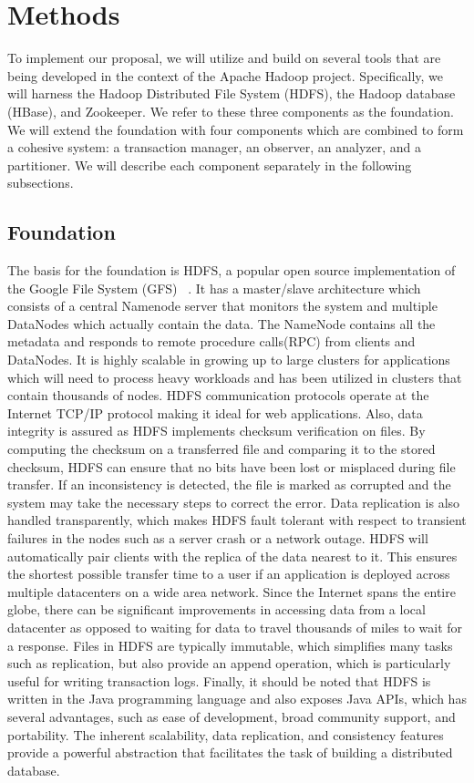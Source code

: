 \documentclass[10pt,final,journal]{IEEEtran}
\begin{document}


\section{Methods}
To implement our proposal, we will utilize and build on several tools that are being developed in the context of the Apache Hadoop project. Specifically, we will harness the Hadoop Distributed File System (HDFS), the Hadoop database (HBase), and Zookeeper. We refer to these three components as the foundation. We will extend the foundation with four components which are combined to form a cohesive system: a transaction manager, an observer, an analyzer, and a partitioner. We will describe each component separately in the following subsections.

\subsection{Foundation}
The basis for the foundation is HDFS, a popular open source implementation of the Google File System (GFS) ~\cite{Ghemawat:2003:GFS:1165389.945450}. It has a master/slave architecture which consists of a central Namenode server that monitors the system and multiple DataNodes which actually contain the data. The NameNode contains all the metadata and responds to remote procedure calls(RPC) from clients and DataNodes. It is highly scalable in growing up to large clusters for applications which will need to process heavy workloads and has been utilized in clusters that contain thousands of nodes.  HDFS communication protocols operate at the Internet TCP/IP protocol making it ideal for web applications. Also, data integrity is assured as HDFS implements checksum verification on files. By computing the checksum on a transferred file and comparing it to the stored checksum, HDFS can ensure that no bits have been lost or misplaced during file transfer. If an inconsistency is detected, the file is marked as corrupted and the system may take the necessary steps to correct the error.  Data replication is also handled transparently, which makes HDFS fault tolerant with respect to transient failures in the nodes such as a server crash or a network outage. HDFS will automatically pair clients with the replica of the data nearest to it. This ensures the shortest possible transfer time to a user if an application is deployed across multiple datacenters on a wide area network. Since the Internet spans the entire globe, there can be significant improvements in accessing data from a local datacenter as opposed to waiting for data to travel thousands of miles to wait for a response. Files in HDFS are typically immutable, which simplifies many tasks such as replication, but also provide an append operation, which is particularly useful for writing transaction logs. Finally, it should be noted that HDFS is written in the Java programming language and also exposes Java APIs, which has several advantages, such as ease of development, broad community support, and portability. The inherent scalability, data replication, and consistency features provide a powerful abstraction that facilitates the task of building a distributed database.
\end{document}
